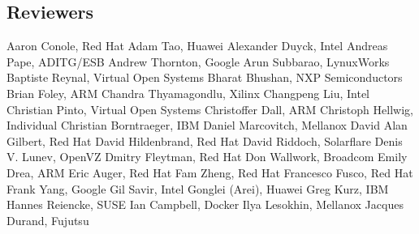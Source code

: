 \subsection*{Reviewers}
Aaron Conole,	Red Hat	\newline
Adam Tao,	Huawei	\newline
Alexander Duyck,	Intel	\newline
Andreas Pape,	ADITG/ESB	\newline
Andrew Thornton,  Google \newline
Arun Subbarao,	LynuxWorks	\newline
Baptiste Reynal,	Virtual Open Systems	\newline
Bharat Bhushan,	NXP Semiconductors	\newline
Brian Foley,  ARM \newline
Chandra Thyamagondlu,	Xilinx	\newline
Changpeng Liu,	Intel	\newline
Christian Pinto,	Virtual Open Systems	\newline
Christoffer Dall,	ARM	\newline
Christoph Hellwig,	Individual \newline
Christian Borntraeger,	IBM	\newline
Daniel Marcovitch,	Mellanox	\newline
David Alan Gilbert, Red Hat \newline
David Hildenbrand,	Red Hat	\newline
David Riddoch,	Solarflare	\newline
Denis V. Lunev,	OpenVZ	\newline
Dmitry Fleytman,	Red Hat	\newline
Don Wallwork,	Broadcom	\newline
Emily Drea,	ARM	\newline
Eric Auger,	Red Hat	\newline
Fam Zheng, Red Hat	\newline
Francesco Fusco,	Red Hat	\newline
Frank Yang,	Google	\newline
Gil Savir,	Intel	\newline
Gonglei (Arei),	Huawei	\newline
Greg Kurz,	IBM	\newline
Hannes Reiencke, SUSE	\newline
Ian Campbell,	Docker	\newline
Ilya Lesokhin,	Mellanox	\newline
Jacques Durand,	Fujutsu	\newline
